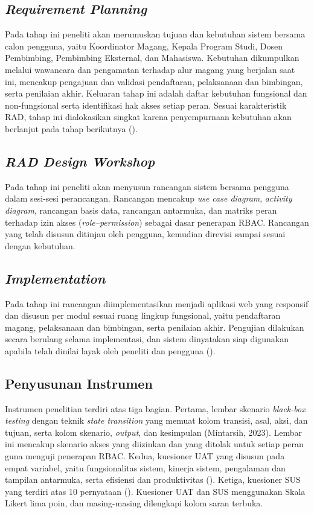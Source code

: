\subsection{\textit{Requirement Planning}}
Pada tahap ini peneliti akan merumuskan tujuan dan kebutuhan sistem bersama
calon pengguna, yaitu Koordinator Magang, Kepala Program Studi, Dosen
Pembimbing, Pembimbing Eksternal, dan Mahasiswa. Kebutuhan dikumpulkan melalui
wawancara dan pengamatan terhadap alur magang yang berjalan saat ini, mencakup
pengajuan dan validasi pendaftaran, pelaksanaan dan bimbingan, serta penilaian
akhir. Keluaran tahap ini adalah daftar kebutuhan fungsional dan non-fungsional
serta identifikasi hak akses setiap peran. Sesuai karakteristik RAD, tahap ini
dialokasikan singkat karena penyempurnaan kebutuhan akan berlanjut pada tahap
berikutnya (\cite{Parlika2023}).

\subsection{\textit{RAD Design Workshop}}
Pada tahap ini peneliti akan menyusun rancangan sistem bersama pengguna dalam
sesi-sesi perancangan. Rancangan mencakup \textit{use case diagram},
\textit{activity diagram}, rancangan basis data, rancangan antarmuka, dan
matriks peran terhadap izin akses (\textit{role--permission}) sebagai dasar
penerapan RBAC. Rancangan yang telah disusun ditinjau oleh pengguna, kemudian
direvisi sampai sesuai dengan kebutuhan.

\subsection{\textit{Implementation}}
Pada tahap ini rancangan diimplementasikan menjadi aplikasi web yang responsif
dan disusun per modul sesuai ruang lingkup fungsional, yaitu pendaftaran magang,
pelaksanaan dan bimbingan, serta penilaian akhir. Pengujian dilakukan secara
berulang selama implementasi, dan sistem dinyatakan siap digunakan apabila telah
dinilai layak oleh peneliti dan pengguna (\cite{Parlika2023}).

\subsection{Penyusunan Instrumen}
Instrumen penelitian terdiri atas tiga bagian. Pertama, lembar skenario
\textit{black-box testing} dengan teknik \textit{state transition} yang memuat
kolom transisi, asal, aksi, dan tujuan, serta kolom skenario, \textit{output},
dan kesimpulan (Mintarsih, 2023). Lembar ini mencakup skenario akses yang
diizinkan dan yang ditolak untuk setiap peran guna menguji penerapan RBAC.
Kedua, kuesioner UAT yang disusun pada empat variabel, yaitu fungsionalitas
sistem, kinerja sistem, pengalaman dan tampilan antarmuka, serta efisiensi dan
produktivitas (\cite{AliyahAliyah2025}). Ketiga, kuesioner SUS yang
terdiri atas 10 pernyataan (\cite{Fiandhika2024}). Kuesioner UAT dan SUS
menggunakan Skala Likert lima poin, dan masing-masing dilengkapi kolom saran
terbuka.

